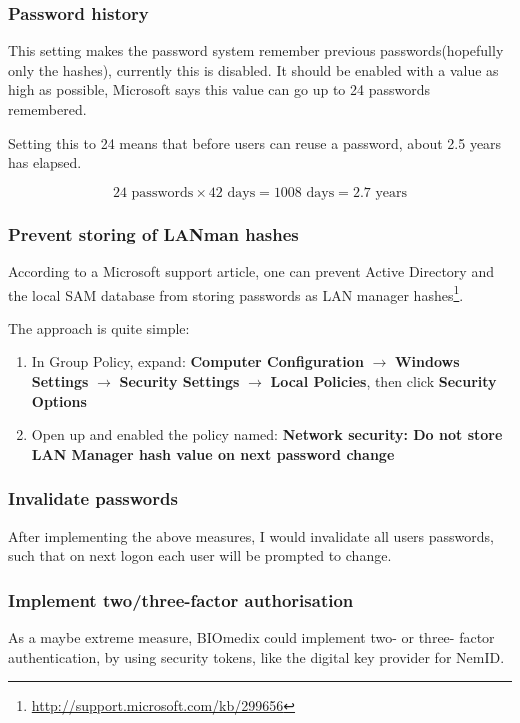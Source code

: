 \subsubsection{Password history}
This setting makes the password system remember previous passwords(hopefully
only the hashes), currently this is disabled. It should be enabled with a value
as high as possible, Microsoft says this value can go up to 24 passwords
remembered.

Setting this to 24 means that before users can reuse a password, about 2.5 years has elapsed.

\[
    24\text{ passwords} \times 42\text{ days} = 1008\text{ days} = 
    2.7\text{ years}
\]

\subsubsection{Prevent storing of LANman hashes}
According to a Microsoft support article, one can prevent Active Directory and 
the local SAM database from storing passwords as LAN manager hashes\footnote{
\href{http://support.microsoft.com/kb/299656}
    {http://support.microsoft.com/kb/299656}}.

The approach is quite simple:

\begin{enumerate}
\item In Group Policy, expand: \textbf{Computer Configuration} $\rightarrow$
    \textbf{Windows Settings} $\rightarrow$ \textbf{Security Settings}
    $\rightarrow$ \textbf{Local Policies}, then click \textbf{Security Options}
\item Open up  and enabled the policy named: \textbf{Network security: Do not store LAN
    Manager hash value on next password change}
\end{enumerate}

\subsubsection{Invalidate passwords}
After implementing the above measures, I would invalidate all users passwords,
such that on next logon each user will be prompted to change.

\subsubsection{Implement two/three-factor authorisation}
As a maybe extreme measure, BIOmedix could implement two- or three- factor
authentication, by using security tokens, like the digital key provider for
NemID.

